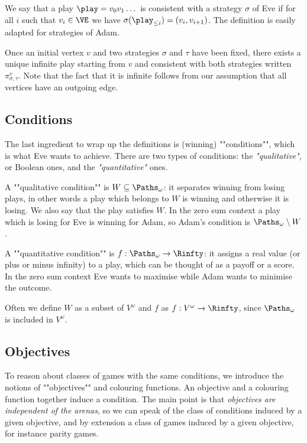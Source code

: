 We say that a play $\play = v_0 v_1 \dots$ is consistent with a strategy $\sigma$ of Eve if
for all $i$ such that $v_i \in \VE$ we have $\sigma(\play_{\le i}) = (v_i,v_{i+1})$.
The definition is easily adapted for strategies of Adam.

Once an initial vertex $v$ and two strategies $\sigma$ and $\tau$ have been fixed, 
there exists a unique infinite play starting from $v$ and consistent with both strategies written~$\pi^{v}_{\sigma,\tau}$.
Note that the fact that it is infinite follows from our assumption that all vertices have an outgoing edge.

\subsection*{Conditions}
The last ingredient to wrap up the definitions is (winning) ""conditions"", which is what Eve wants to achieve.
There are two types of conditions: the \emph{"qualitative"}, or Boolean ones, and the \emph{"quantitative"} ones.

A ""qualitative condition"" is $W \subseteq \Paths_\omega$: it separates winning from losing plays, in other words a play which belongs to $W$ is winning and otherwise it is losing. We also say that the play satisfies $W$.
In the zero sum context a play which is losing for Eve is winning for Adam, so Adam's condition is $\Paths_\omega \setminus W$.

A ""quantitative condition"" is $f : \Paths_\omega \to \Rinfty$: it assigns a real value (or plus or minus infinity) to a play, which can be thought of as a payoff or a score.
In the zero sum context Eve wants to maximise while Adam wants to minimise the outcome.

Often we define $W$ as a subset of $V^\omega$ and $f$ as $f : V^\omega \to \Rinfty$,
since $\Paths_\omega$ is included in $V^\omega$.

\subsection*{Objectives}
To reason about classes of games with the same conditions, we introduce the notions of ""objectives"" and colouring functions.
An objective and a colouring function together induce a condition.
The main point is that \textit{objectives are independent of the arenas}, so we can speak of the class of conditions induced by a given objective,
and by extension a class of games induced by a given objective, for instance parity games.

